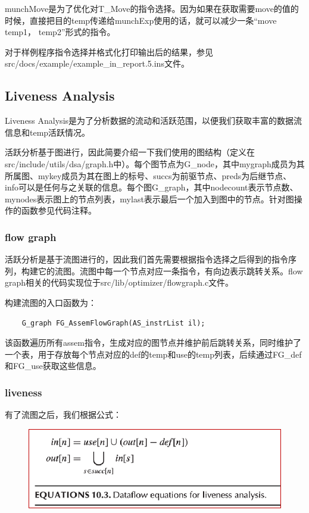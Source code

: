 \documentclass{article}
\begin{document}
munchMove是为了优化对T\_Move的指令选择。因为如果在获取需要move的值的时候，直接把目的temp传递给munchExp使用的话，就可以减少一条“move temp1， temp2”形式的指令。

对于样例程序指令选择并格式化打印输出后的结果，参见src/docs/example/example\_in\_report.5.ins文件。

\subsection{Liveness Analysis}
Liveness Analysis是为了分析数据的流动和活跃范围，以便我们获取丰富的数据流信息和temp活跃情况。

活跃分析基于图进行，因此简要介绍一下我们使用的图结构（定义在src/include/utils/dsa/graph.h中）。每个图节点为G\_node，其中mygraph成员为其所属图、mykey成员为其在图上的标号、succs为前驱节点、preds为后继节点、info可以是任何与之关联的信息。每个图G\_graph，其中nodecount表示节点数、mynodes表示图上的节点列表，mylast表示最后一个加入到图中的节点。针对图操作的函数参见代码注释。

\subsubsection{flow graph}
活跃分析是基于流图进行的，因此我们首先需要根据指令选择之后得到的指令序列，构建它的流图。流图中每一个节点对应一条指令，有向边表示跳转关系。flow graph相关的代码实现位于src/lib/optimizer/flowgraph.c文件。

构建流图的入口函数为：

    \begin{lstlisting}
    G_graph FG_AssemFlowGraph(AS_instrList il);
    \end{lstlisting}

该函数遍历所有assem指令，生成对应的图节点并维护前后跳转关系，同时维护了一个表，用于存放每个节点对应的def的temp和use的temp列表，后续通过FG\_def和FG\_use获取这些信息。

\subsubsection{liveness}
有了流图之后，我们根据公式：
\begin{figure}[h]
  \centering
  \includegraphics[width=.9\linewidth]{pics/liveness_theory.png}
  \label{fig:liv_theory}
\end{figure}
\end{document}
